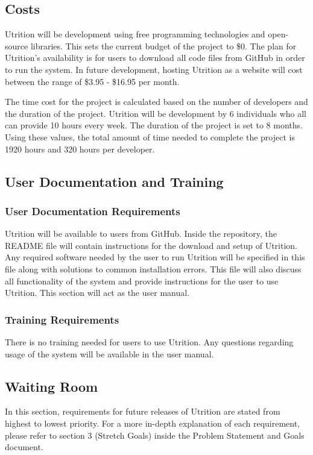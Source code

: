 \documentclass[12pt]{article}
\begin{document}
\subsection{Costs}
Utrition will be development using free programming technologies and open-source libraries. This sets the current budget of the project to \$0. The plan for Utrition's availability is for users to download all code files from GitHub in order to run the system. In future development, hosting Utrition as a website will cost between the range of \$3.95 - \$16.95 per month.

The time cost for the project is calculated based on the number of developers and the duration of the project. Utrition will be development by 6 individuals who all can provide 10 hours every week. The duration of the project is set to 8 months. Using these values, the total amount of time needed to complete the project is 1920 hours and 320 hours per developer.

\subsection{User Documentation and Training}
\subsubsection{User Documentation Requirements}
Utrition will be available to users from GitHub. Inside the repository, the README file will contain instructions for the download and setup of Utrition. Any required software needed by the user to run Utrition will be specified in this file along with solutions to common installation errors. This file will also discuss all functionality of the system and provide instructions for the user to use Utrition. This section will act as the user manual. 

\subsubsection{Training Requirements}
There is no training needed for users to use Utrition. Any questions regarding usage of the system will be available in the user manual.

\subsection{Waiting Room}
In this section, requirements for future releases of Utrition are stated from highest to lowest priority. For a more in-depth explanation of each requirement, please refer to section 3 (Stretch Goals) inside the Problem Statement and Goals document.
\end{document}
